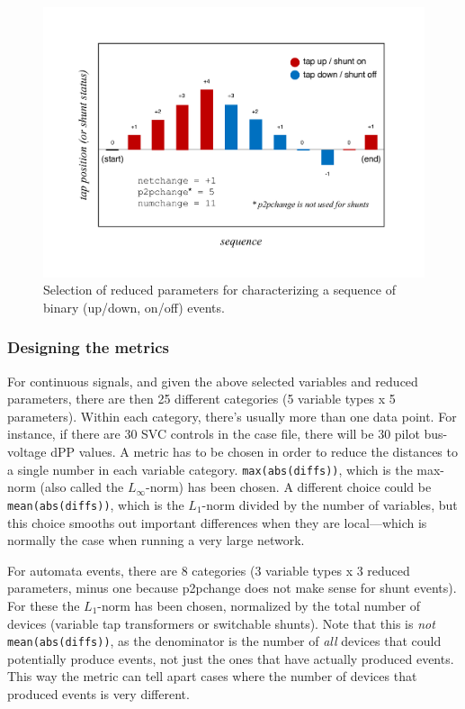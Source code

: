 \documentclass[conference]{IEEEtran}
\newcommand{\code}[1]{\texttt{#1}}
\begin{document}
\begin{figure}
  \centering
  \includegraphics[width=\columnwidth]{figs/transient_characteristics_2}
  \caption{Selection of reduced parameters for characterizing a sequence of
    binary (up/down, on/off) events.}
  \label{fig:tcharacteristics2}
\end{figure}


\subsubsection{Designing the metrics}
\label{sssec:metrics}
For continuous signals, and given the above selected variables and reduced
parameters, there are then 25 different categories (5 variable types x 5
parameters). Within each category, there's usually more than one data point. For
instance, if there are 30 SVC controls in the case file, there will be 30 pilot
bus-voltage dPP values. A metric has to be chosen in order to reduce the
distances to a single number in each variable category. \code{max(abs(diffs))},
which is the max-norm (also called the $L_\infty$-norm) has been chosen.  A
different choice could be \code{mean(abs(diffs))}, which is the $L_1$-norm
divided by the number of variables, but this choice smooths out important
differences when they are local---which is normally the case when running a very
large network.

For automata events, there are 8 categories (3 variable types x 3 reduced
parameters, minus one because p2pchange does not make sense for shunt
events). For these the $L_1$-norm has been chosen, normalized by the total
number of devices (variable tap transformers or switchable shunts). Note that
this is \emph{not} \code{mean(abs(diffs))}, as the denominator is the number of
\emph{all} devices that could potentially produce events, not just the ones that
have actually produced events. This way the metric can tell apart cases where
the number of devices that produced events is very different.
\end{document}
